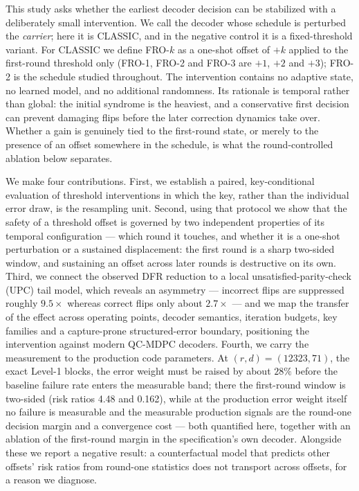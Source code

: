 \documentclass[lettersize,journal]{IEEEtran}
\begin{document}
This study asks whether the earliest decoder decision can be stabilized with a deliberately small intervention. We call the decoder whose schedule is perturbed the \emph{carrier}; here it is CLASSIC, and in the negative control it is a fixed-threshold variant. For CLASSIC we define FRO-$k$ as a one-shot offset of $+k$ applied to the first-round threshold only (FRO-1, FRO-2 and FRO-3 are $+1$, $+2$ and $+3$); FRO-2 is the schedule studied throughout. The intervention contains no adaptive state, no learned model, and no additional randomness. Its rationale is temporal rather than global: the initial syndrome is the heaviest, and a conservative first decision can prevent damaging flips before the later correction dynamics take over. Whether a gain is genuinely tied to the first-round state, or merely to the presence of an offset somewhere in the schedule, is what the round-controlled ablation below separates.

We make four contributions. First, we establish a paired, key-conditional evaluation of threshold interventions in which the key, rather than the individual error draw, is the resampling unit. Second, using that protocol we show that the safety of a threshold offset is governed by two independent properties of its temporal configuration --- which round it touches, and whether it is a one-shot perturbation or a sustained displacement: the first round is a sharp two-sided window, and sustaining an offset across later rounds is destructive on its own. Third, we connect the observed DFR reduction to a local unsatisfied-parity-check (UPC) tail model, which reveals an asymmetry --- incorrect flips are suppressed roughly $9.5\times$ whereas correct flips only about $2.7\times$ --- and we map the transfer of the effect across operating points, decoder semantics, iteration budgets, key families and a capture-prone structured-error boundary, positioning the intervention against modern QC-MDPC decoders. Fourth, we carry the measurement to the production code parameters. At $(r,d)=(12323,71)$, the exact Level-1 blocks, the error weight must be raised by about $28\%$ before the baseline failure rate enters the measurable band; there the first-round window is two-sided (risk ratios 4.48 and 0.162), while at the production error weight itself no failure is measurable and the measurable production signals are the round-one decision margin and a convergence cost --- both quantified here, together with an ablation of the first-round margin in the specification's own decoder. Alongside these we report a negative result: a counterfactual model that predicts other offsets' risk ratios from round-one statistics does not transport across offsets, for a reason we diagnose.
\end{document}
